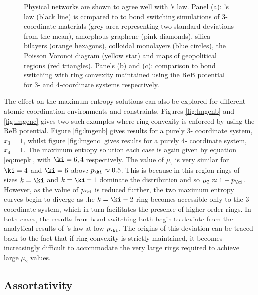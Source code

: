 \begin{figure}[bt]
     \caption{Physical networks are shown to agree well with \lm's law. Panel (a): \lm's law (black line) is compared to to bond switching simulations of 3\--coordinate \td{} materials (grey area representing two standard deviations from the mean), amorphous graphene (pink diamonds), silica bilayers (orange hexagons), colloidal monolayers (blue circles), the Poisson Voronoi diagram (yellow star) and maps of geopolitical regions (red triangles). Panels (b) and (c): comparison to bond switching with ring convexity maintained using the ReB potential for 3\-- and 4\--coordinate systems respectively.}
     \label{fig:lmgen}
\end{figure}

The effect on the maximum entropy solutions can also be explored for different atomic coordination environments and constraints.
Figures \ref{fig:lmgenb} and \ref{fig:lmgenc} gives two such examples where ring convexity is enforced by using the ReB potential.
Figure \ref{fig:lmgenb} gives results for a purely 3\-- coordinate system, $x_3=1$, whilst figure \ref{fig:lmgenc} gives results for a purely 4\-- coordinate system, $x_4=1$.
The maximum entropy solution each case is again given by equation \eqref{eq:mepk}, with $\ki=6,4$ respectively.
The value of $\mu_2$ is very similar for $\ki=4$ and $\ki=6$ above $p_{\ki}\approx 0.5$.
This is because in this region rings of sizes $k=\ki$ and $k=\ki\pm1$ dominate the distribution and so $\mu_2\approx 1-p_{\ki}$.
However, as the value of $p_{\ki}$ is reduced further, the two maximum entropy curves begin to diverge as the $k=\ki-2$ ring becomes accessible only to the 3- coordinate system, which in turn facilitates the presence of higher order rings.
In both cases, the results from bond switching both begin to deviate from the analytical results of \lm's{} law at low $p_{\ki}$.
The origins of this deviation can be traced back to the fact that if ring convexity is strictly maintained, it becomes increasingly difficult to accommodate the very large rings required to achieve large $\mu_2$ values.


\subsection{Assortativity}
\label{s:genassortativity}

